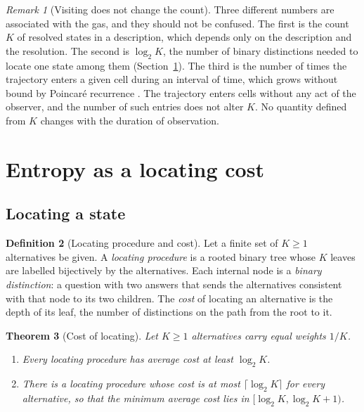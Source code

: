 \documentclass[11pt,a4paper]{article}
\newtheorem{theorem}{Theorem}[section]
\theoremstyle{definition}
\newtheorem{definition}[theorem]{Definition}
\theoremstyle{remark}
\newtheorem{remark}[theorem]{Remark}
\begin{document}
\begin{remark}[Visiting does not change the count]
\label{rem:three-counts}
Three different numbers are associated with the gas, and they should not be confused.
The first is the count $K$ of resolved states in a description, which depends only on the description and the resolution.
The second is $\log_2K$, the number of binary distinctions needed to locate one state among them (Section~\ref{sec:entropy}).
The third is the number of times the trajectory enters a given cell during an interval of time, which grows without bound by Poincar\'e recurrence \citep{poincare1890}.
The trajectory enters cells without any act of the observer, and the number of such entries does not alter $K$.
No quantity defined from $K$ changes with the duration of observation.
\end{remark}

\section{Entropy as a locating cost}
\label{sec:entropy}

\subsection{Locating a state}

\begin{definition}[Locating procedure and cost]
\label{def:locating}
Let a finite set of $K\ge1$ alternatives be given.
A \emph{locating procedure} is a rooted binary tree whose $K$ leaves are labelled bijectively by the alternatives.
Each internal node is a \emph{binary distinction}: a question with two answers that sends the alternatives consistent with that node to its two children.
The \emph{cost} of locating an alternative is the depth of its leaf, the number of distinctions on the path from the root to it.
\end{definition}

\begin{theorem}[Cost of locating]
\label{thm:locating}
Let $K\ge1$ alternatives carry equal weights $1/K$.
\begin{enumerate}[label=(\roman*),leftmargin=2.2em]
\item Every locating procedure has average cost at least $\log_2K$.
\item There is a locating procedure whose cost is at most $\lceil\log_2K\rceil$ for every alternative, so that the minimum average cost lies in $[\log_2K,\log_2K+1)$.
\end{enumerate}
\end{theorem}
\end{document}

